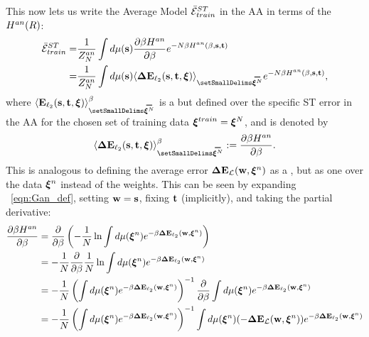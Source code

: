 %
This now lets us write the Average Model \TrainingError $\bar{\mathcal{E}}^{ST}_{train}$ in the AA in terms of the \AnnealedHamiltonian $H^{an}(R)$:
  \begin{align}
  \nonumber
  \AVGSTTE
   =& \dfrac{1}{Z^{an}_{\ND}}\int d\mu(\SVEC)\dfrac{\partial \beta\HAN}{\partial \beta} e^{-\ND\beta\HAN(\beta,\SVEC,\TVEC)} \\ 
  \label{eqn:EtM2}
   =& \dfrac{1}{Z^{an}_{\ND}}\int d\mu(\SVEC)\langle  \mathbf{\Delta E}_{\ell_2}(\SVEC,\TVEC,\XI) \rangle_{\AVGNDXI} e^{-\ND\beta\HAN(\beta,\SVEC,\TVEC)}  ,
  \end{align}
  where $\langle \mathbf{E}_{\ell_2}(\SVEC,\TVEC,\XI) \rangle^{\beta}_{\AVGNDXI}$
  is a \ThermalAverage but defined over the specific ST error in the AA for the chosen set of training data $\boldsymbol{\xi}^{train}=\boldsymbol{\xi}^{N}$, and is denoted by 
 \begin{align}
   \langle  \mathbf{\Delta}\mathbf{E}_{\ell_2}(\SVEC,\TVEC,\XI) \rangle^{\beta}_{\AVGNDXI}:=\dfrac{\partial \beta\HAN}{\partial \beta}.
 \end{align}
 This is analogous to defining the average error $\mathbf{\Delta {E}}_{\mathcal{L}}(\mathbf{w}, \boldsymbol{\xi}^{n})$ as a \ThermalAverage, but as one over the data $\boldsymbol{\xi}^{n}$ instead of the weights.  This can be seen by expanding \EQN~\ref{eqn:Gan_def}, setting ${\mathbf{w}}={\mathbf{s}}$, fixing ${\mathbf{t}}$ (implicitly), and taking the partial derivative:
 \begin{align}
  \label{eqn:partial_Gan}
  \dfrac{\partial \beta H^{an}}{\partial \beta}
  &=  \dfrac{\partial }{\partial \beta} \left(-\frac{1}{N}\ln \int d\mu(\boldsymbol{\xi}^{n})e^{-\beta\mathbf{\Delta {E}}_{\ell_2}(\mathbf{w}, \boldsymbol{\xi}^{n})}\right) \\ \nonumber
  &=  -\frac{1}{N}\dfrac{\partial }{\partial \beta} \frac{1}{N}\ln \int d\mu(\boldsymbol{\xi}^{n})e^{-\beta\mathbf{\Delta {E}}_{\ell_2}(\mathbf{w}, \boldsymbol{\xi}^{n})} \\ \nonumber
  &=  -\frac{1}{N} \left( \int d\mu(\boldsymbol{\xi}^{n})e^{-\beta\mathbf{\Delta {E}}_{\ell_2}(\mathbf{w}, \boldsymbol{\xi}^{n})}\right)^{-1}\dfrac{\partial }{\partial \beta} \int d\mu(\boldsymbol{\xi}^{n})e^{-\beta\mathbf{\Delta {E}}_{\ell_2}(\mathbf{w}, \boldsymbol{\xi}^{n})} \\ \nonumber
    &=  -\frac{1}{N} \left(\int d\mu(\boldsymbol{\xi}^{n})e^{-\beta\mathbf{\Delta {E}}_{\ell_2}(\mathbf{w}, \boldsymbol{\xi}^{n})}\right)^{-1} \int d\mu(\boldsymbol{\xi}^{n})(-\mathbf{\Delta {E}}_{\mathcal{L}}(\mathbf{w}, \boldsymbol{\xi}^{n}))e^{-\beta\mathbf{\Delta {E}}_{\ell_2}(\mathbf{w}, \boldsymbol{\xi}^{n})}
 \end{align}

